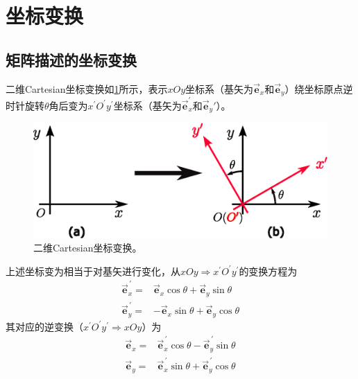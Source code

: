 \section{坐标变换}

\subsection{矩阵描述的坐标变换}
二维Cartesian坐标变换如\cref{fig:2dimCartesianCoordTrans}所示，表示$xOy$坐标系（基矢为$\vec{\bm{e}}_{x}$和$\vec{\bm{e}}_{y}$）绕坐标原点逆时针旋转$\theta$角后变为$x^{\prime}O^{\prime}y^{\prime}$坐标系（基矢为$\vec{\bm{e}}_{x}^{\prime}$和$\vec{\bm{e}}_{y}{\prime}$）。
\begin{figure}[htb]
    \centering
    \setlength{\abovecaptionskip}{0.2cm}
    \includegraphics[scale=0.8]{figure/math/2dim-transform.eps}
    \caption{二维Cartesian坐标变换。}
    \label{fig:2dimCartesianCoordTrans}
\end{figure}

上述坐标变为相当于对基矢进行变化，从$xOy\Rightarrow x^{\prime}O^{\prime}y^{\prime}$的变换方程为
\begin{equation}\begin{aligned}
    \vec{\bm{e}}_{x}^{\,\prime} =& \vec{\bm{e}}_{x}\cos{\theta} + \vec{\bm{e}}_{y}\sin{\theta} \\
    \vec{\bm{e}}_{y}^{\,\prime} =& -\vec{\bm{e}}_{x}\sin{\theta} + \vec{\bm{e}}_{y}\cos{\theta}
    \label{eq:rot-char-eq}
\end{aligned}\end{equation}
其对应的逆变换（$x^{\prime}O^{\prime}y^{\prime} \Rightarrow xOy$）为
\begin{equation}\begin{aligned}
    \vec{\bm{e}}_{x} =& \vec{\bm{e}}_{x}^{\,\prime}\cos{\theta} - \vec{\bm{e}}_{y}^{\,\prime}\sin{\theta} \\
    \vec{\bm{e}}_{y} =& \vec{\bm{e}}_{x}^{\,\prime}\sin{\theta} + \vec{\bm{e}}_{y}^{\,\prime}\cos{\theta}
    \label{eq:inver-rot-char-eq}
\end{aligned}\end{equation}

